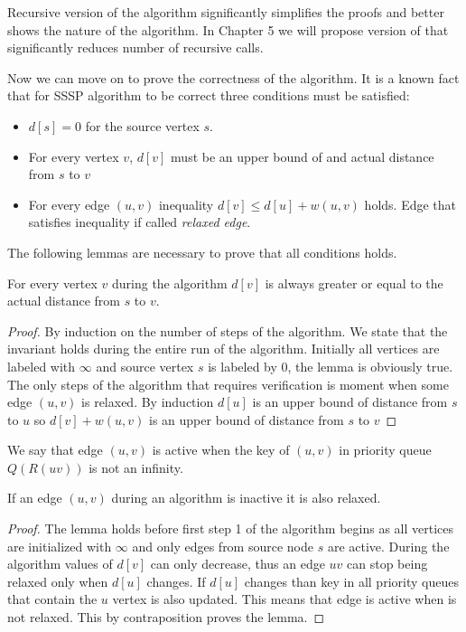 Recursive version of the algorithm significantly simplifies the proofs and better shows the nature of the algorithm.
In Chapter 5 we will propose version of  that significantly reduces number of recursive calls.

Now we can move on to prove the correctness of the algorithm. It is a known fact that for SSSP algorithm to be correct three conditions must be satisfied:
\begin{itemize}
    \item $d[s] = 0$ for the source vertex $s$.
    \item For every vertex $v$, $d[v]$ must be an upper bound of and actual distance from $s$ to $v$
    \item For every edge $(u, v)$ inequality $d[v] \leq d[u] + w(u,v)$ holds. Edge that satisfies inequality if called \emph{relaxed edge}.
\end{itemize}

The following lemmas are necessary to prove that all conditions holds.

\begin{lemma}
\label{condition2}
For every vertex $v$ during the algorithm $d[v]$ is always greater or equal to the actual distance from $s$ to $v$.
\end{lemma}
\begin{proof}
By induction on the number of steps of the algorithm. We state that the invariant holds during the entire run of the algorithm. Initially all vertices are labeled with $\infty$ and source vertex $s$ is labeled by $0$, the lemma is obviously true. The only steps of the algorithm that requires verification is moment when some edge $(u, v)$ is relaxed. By induction $d[u]$ is an upper bound of distance from $s$ to $u$ so $d[v] + w(u,v)$ is an upper bound of distance from $s$ to $v$

\end{proof}
We say that edge $(u, v)$ is active when the key of $(u, v)$ in priority queue $Q(R(u v))$ is not an infinity.

\begin{lemma} 
\label{relaxed}
If an edge $(u, v)$ during an algorithm is inactive it is also relaxed.
\end{lemma}
\begin{proof}
The lemma holds before first step 1 of the algorithm begins as all vertices are initialized with $\infty$ and only edges from source node $s$ are active. During the algorithm values of $d[v]$ can only decrease, thus an edge $u v$ can stop being relaxed only when $d[u]$ changes. If $d[u]$ changes than key in all priority queues that contain the $u$ vertex is also updated. This means that edge is active when is not relaxed. This by contraposition proves the lemma. 
\end{proof}

